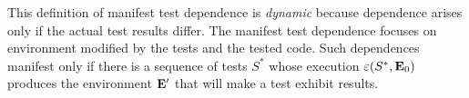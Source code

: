 


This definition of manifest test dependence is \emph{dynamic} because
dependence arises only if the actual test results differ.
The manifest test dependence focuses on environment modified
by the tests and the tested code. Such dependences manifest only
if there is a sequence of tests $S^*$ whose execution
$\varepsilon(S^*,\mathbf{E}_0)$  produces the
environment $\mathbf{E}'$ that will make a test exhibit results.

%

%
%
%

